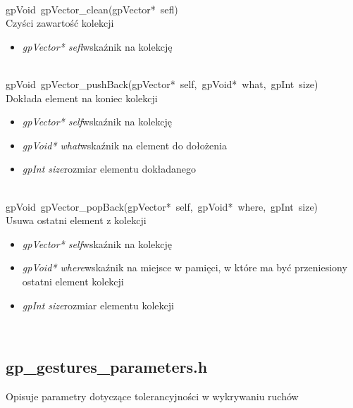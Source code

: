 \ \\
\mbox{\textsf{gpVoid gpVector_clean(gpVector* sefl)}} \\ \indent Czyści zawartość kolekcji
	\begin{itemize}
		\item \textit{gpVector* sefl}\quad wskaźnik na kolekcję
	\end{itemize}

 \ \\
\mbox{\textsf{gpVoid gpVector_pushBack(gpVector* self, gpVoid* what, gpInt size)}} \\ \indent Dokłada element na koniec kolekcji
	\begin{itemize}
		\item \textit{gpVector* self}\quad wskaźnik na kolekcję
		\item \textit{gpVoid* what}\quad wskaźnik na element do dołożenia
		\item \textit{gpInt size}\quad rozmiar elementu dokładanego
	\end{itemize}

 \ \\
\mbox{\textsf{gpVoid gpVector_popBack(gpVector* self, gpVoid* where, gpInt size)}} \\ \indent Usuwa ostatni element z kolekcji
	\begin{itemize}
		\item \textit{gpVector* self}\quad wskaźnik na kolekcję
		\item \textit{gpVoid* where}\quad wskaźnik na miejsce w pamięci, w które ma być przeniesiony ostatni element kolekcji
		\item \textit{gpInt size}\quad rozmiar elementu kolekcji
	\end{itemize}

 \ \\

\subsection{gp_gestures_parameters.h}
Opisuje parametry dotyczące tolerancyjności w wykrywaniu ruchów
